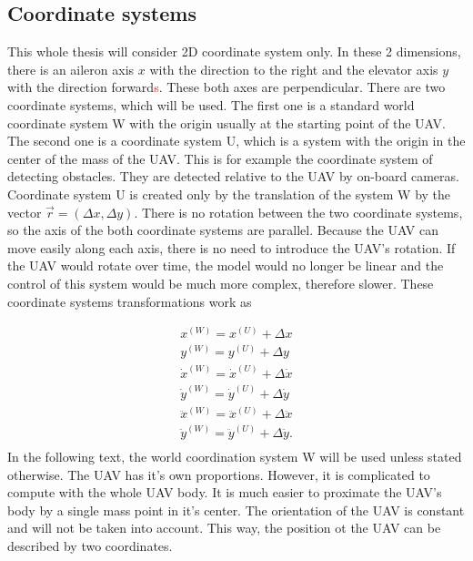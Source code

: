 \documentclass[a4paper,11pt,titlepage]{article}
\begin{document}
\subsection{Coordinate systems}
\label{ssec:coordinate_system}
This whole thesis will consider 2D coordinate system only. In these 2 dimensions, there is an aileron axis $x$ with the direction to the right and the elevator axis $y$ with the direction forward\textcolor{red}{s}. These both axes are perpendicular. There are two coordinate systems, which will be used. The first one is a standard world coordinate system W with the origin usually at the starting point of the UAV. The second one is a coordinate system U, which is a system with the origin in the center of the mass of the UAV. This is for example the coordinate system of detecting obstacles. They are detected relative to the UAV by on-board cameras. Coordinate system U is created only by the translation of the system W by the vector $\vec{r} = (\Delta x, \Delta y)$. There is no rotation between the two coordinate systems, so the axis of the both coordinate systems are parallel. Because the UAV can move easily along each axis, there is no need to introduce the UAV's rotation. If the UAV would rotate over time, the model would no longer be linear and the control of this system would be much more complex, therefore slower. These coordinate systems transformations work as

\begin{equation}
\label{eq:coordinate_transform}
\begin{split}
x^{(W)} = x^{(U)}+\Delta x	\\
y^{(W)} = y^{(U)}+\Delta y	\\
\dot{x}^{(W)} = \dot{x}^{(U)}+\Delta \dot{x}	\\
\dot{y}^{(W)} = \dot{y}^{(U)}+\Delta \dot{y}	\\
\ddot{x}^{(W)} = \ddot{x}^{(U)}+\Delta \ddot{x}	\\
\ddot{y}^{(W)} = \ddot{y}^{(U)}+\Delta \ddot{y}.	\\
\end{split}
\end{equation}
In the following text, the world coordination system W will be used unless stated otherwise. The UAV has it's own proportions. However, it is complicated to compute with the whole UAV body. It is much easier to proximate the UAV's body by a single mass point in it's center. The orientation of the UAV is constant and will not be taken into account. This way, the position ot the UAV can be described by two coordinates. 
\end{document}
